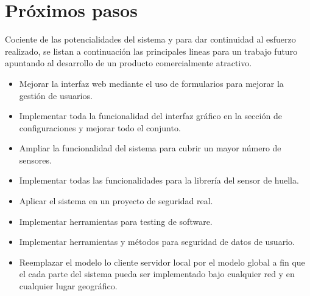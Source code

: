 \section{Próximos pasos}

Cociente de las potencialidades del sistema y para dar continuidad al esfuerzo realizado, se listan a continuación las principales lineas para un trabajo futuro apuntando al desarrollo de un producto comercialmente atractivo.

\begin{itemize}
\item Mejorar la interfaz web mediante el uso de formularios para mejorar la gestión de usuarios.

\item Implementar toda la funcionalidad del interfaz gráfico en la sección de configuraciones y mejorar todo el conjunto.

\item Ampliar la funcionalidad del sistema para cubrir un mayor número de sensores.

\item Implementar todas las funcionalidades para la librería del sensor de huella.

\item Aplicar el sistema en un proyecto de seguridad real.

\item Implementar herramientas para testing de software.

\item Implementar herramientas y métodos para seguridad de datos de usuario.

\item Reemplazar el modelo lo cliente servidor local por el modelo global a fin que el cada parte del sistema pueda ser implementado bajo cualquier red y en cualquier lugar geográfico.

\end{itemize}
